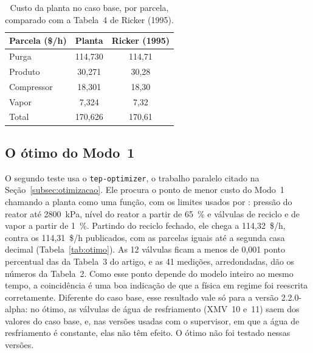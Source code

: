 \begin{table}[htbp]
	\centering
	\caption{Custo da planta no caso base, por parcela, comparado com a Tabela~4 de Ricker (1995).}
	\label{tab:custo_caso_base}
	\footnotesize
	\begin{tabular}{lcc}
		\hline
		\multicolumn{1}{c|}{\textbf{Parcela (\$/h)}} & \multicolumn{1}{c|}{\textbf{Planta}} & \multicolumn{1}{c}{\textbf{Ricker (1995)}} \\
		\hline
		Purga & 114,730 & 114,71 \\
		Produto & 30,271 & 30,28 \\
		Compressor & 18,301 & 18,30 \\
		Vapor & 7,324 & 7,32 \\
		Total & 170,626 & 170,61 \\
		\hline
	\end{tabular}
\end{table}

\subsection{O ótimo do Modo~1}
\label{subsec:val_otimo}

O segundo teste usa o \texttt{tep-optimizer}, o trabalho paralelo citado na Seção~\ref{subsec:otimizacao}. Ele procura o ponto de menor custo do Modo~1 chamando a planta como uma função, com os limites usados por : pressão do reator até 2800~kPa, nível do reator a partir de 65~\% e válvulas de reciclo e de vapor a partir de 1~\%. Partindo do reciclo fechado, ele chega a 114,32~\$/h, contra os 114,31~\$/h publicados, com as parcelas iguais até a segunda casa decimal (Tabela~\ref{tab:otimo}). As 12 válvulas ficam a menos de 0,001 ponto percentual das da Tabela~3 do artigo, e as 41 medições, arredondadas, dão os números da Tabela~2. Como esse ponto depende do modelo inteiro ao mesmo tempo, a coincidência é uma boa indicação de que a física em regime foi reescrita corretamente. Diferente do caso base, esse resultado vale só para a versão 2.2.0-alpha: no ótimo, as válvulas de água de resfriamento (XMV~10 e~11) saem dos valores do caso base, e, nas versões usadas com o supervisor, em que a água de resfriamento é constante, elas não têm efeito. O ótimo não foi testado nessas versões.

